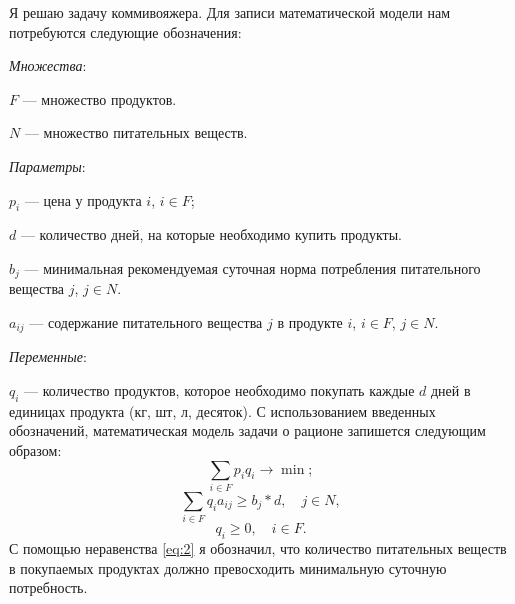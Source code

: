 \documentclass[]{article}
\begin{document}
Я решаю задачу коммивояжера.
Для записи математической модели нам потребуются следующие обозначения:
\par
\textit{Множества}:
\par\noindent
$F$ --- множество продуктов.
\par\noindent
$N$ --- множество питательных веществ.
\par
\textit{Параметры}:
\par\noindent
$p_i$ --- цена у продукта $i$, $i\in F$;
\par\noindent
$d$ --- количество дней, на которые необходимо купить продукты.
\par\noindent
$b_{j}$ --- минимальная рекомендуемая суточная норма потребления питательного вещества $j$, $j\in N$.
\par\noindent
$a_{ij}$ --- содержание питательного вещества $j$ в продукте $i$, $i\in F$, $j\in N$.
\par
\textit{Переменные}:
\par\noindent
$q_i$ --- количество продуктов, которое необходимо покупать каждые $d$ дней в
единицах продукта (кг, шт, л, десяток).
С использованием введенных обозначений, математическая модель задачи о рационе
запишется следующим образом:
\begin{equation}
\sum_{i\in F}p_iq_i\rightarrow\min;
\end{equation}
\begin{equation}\label{eq:2}
	\sum_{i\in F}
			q_ia_{ij} \geq b_j*d,\quad j\in N,
\end{equation}
\begin{equation}
    q_i \geq 0,\quad i\in F.
\end{equation}
С помощью неравенства \eqref{eq:2} я обозначил, что количество питательных
веществ в покупаемых продуктах должно превосходить минимальную суточную
потребность.
\end{document}
